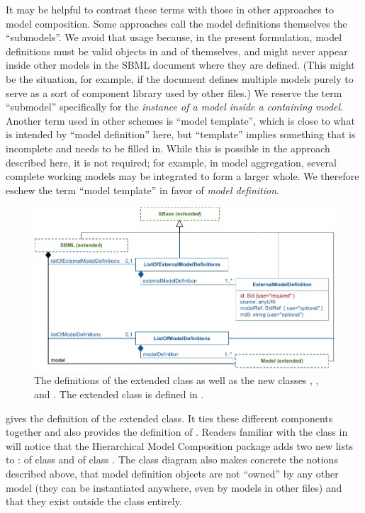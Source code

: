 It may be helpful to contrast these terms with those in other approaches to model composition.  Some approaches call the model definitions themselves the ``submodels''.  We avoid that usage because, in the present formulation, model definitions must be valid \Model objects in and of themselves, and might never appear inside other models in the SBML document where they are defined.  (This might be the situation, for example, if the document defines multiple models purely to serve as a sort of component library used by other files.)  We reserve the term ``submodel'' specifically for the \emph{instance of a  model inside a containing model}.  Another term used in other schemes is ``model template'', which is close to what is intended by ``model definition'' here, but ``template'' implies something that is incomplete and needs to be filled in.  While this is possible in the approach described here, it is not required; for example, in model aggregation, several complete working models may be integrated to form a larger whole.  We therefore eschew the term ``model template'' in favor of \emph{model definition}.

\begin{figure}[b]
  \includegraphics{figs/hierarchical-sbml}
  \caption{The definitions of the extended \SBML class as well as the
    new classes \ListOfModelDefinitions,
    \ListOfExternalModelDefinitions, and \ExternalModelDefinition.  The
    extended \Model class is defined in .}
  \label{hierarchical-sbml-uml}
  \label{sbml-uml}
\end{figure}

 gives the definition of the extended \SBML class. It ties these different components together and also provides the definition of \ExternalModelDefinition.  Readers familiar with the \SBML class in \sbmlthreecore will notice that the Hierarchical Model Composition package adds two new lists to \SBML:  of class \ListOfModelDefinitions and  of class \ListOfExternalModelDefinitions.  The class diagram also makes concrete the notions described above, that model definition objects are not ``owned'' by any other model (they can be instantiated anywhere, even by models in other files) and that they exist outside the \Model class entirely.

